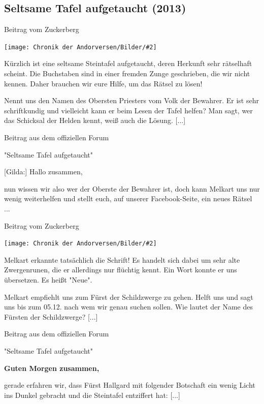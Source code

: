\documentclass[10pt, a4paper, oneside]{book}
\newcommand{\storytext}[1]{%
    \section{#1}%
    \label{Storytext: #1}%
}
\newcommand{\bildmitts}[2][height=0.32\textwidth,width=0.48\textwidth,keepaspectratio]{%
    \begin{center}
        \texttt{[image: Chronik der Andorversen/Bilder/\#2]}
    \end{center}
}
\begin{document}
\begin{multicols}{2}
\storytext{Seltsame Tafel aufgetaucht (2013)}

\begin{center}
    Beitrag vom Zuckerberg
\end{center}

\bildmitts{Seltsame Tafel Bild 1.jpg}

Kürzlich ist eine seltsame Steintafel aufgetaucht, deren Herkunft sehr rätselhaft scheint. Die Buchstaben sind in einer fremden Zunge geschrieben, die wir nicht kennen. Daher brauchen wir eure Hilfe, um das Rätsel zu lösen!

Nennt uns den Namen des Obersten Priesters vom Volk der Bewahrer. Er ist sehr schriftkundig und vielleicht kann er beim Lesen der Tafel helfen? Man sagt, wer das Schicksal der Helden kennt, weiß auch die Lösung. [...]

\begin{center}
    Beitrag aus dem offiziellen Forum

    "Seltsame Tafel aufgetaucht"
\end{center}

[Gilda:] Hallo zusammen,

nun wissen wir also wer der Oberste der Bewahrer ist, doch kann Melkart uns nur wenig weiterhelfen und stellt euch, auf unserer Facebook-Seite, ein neues Rätsel ...

\begin{center}
    Beitrag vom Zuckerberg
\end{center}

\bildmitts{Seltsame Tafel Bild 2.jpg}

Melkart erkannte tatsächlich die Schrift! Es handelt sich dabei um sehr alte Zwergenrunen, die er allerdings nur flüchtig kennt. Ein Wort konnte er uns übersetzen. Es heißt "Neue".

Melkart empfiehlt uns zum Fürst der Schildzwerge zu gehen. Helft uns und sagt uns bis zum 05.12. nach wem wir genau suchen sollen. Wie lautet der Name des Fürsten der Schildzwerge? [...]

\begin{center}
    Beitrag aus dem offiziellen Forum

    "Seltsame Tafel aufgetaucht"
\end{center}

\textbf{Guten Morgen zusammen,}

gerade erfahren wir, dass Fürst Hallgard mit folgender Botschaft ein wenig Licht ins Dunkel gebracht und die Steintafel entziffert hat: [...] 


\end{multicols}
\end{document}
